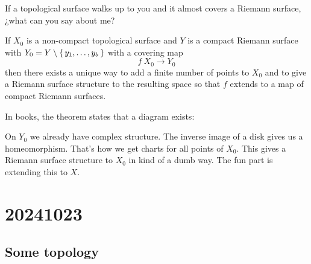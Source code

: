 \documentclass[12pt]{memoir}
\begin{document}
\begin{significant}
    If a topological surface walks up to you and it almost covers a Riemann surface, ¿what can you say about me?
\end{significant}

\begin{Th}[$R\exists T$]
    If $X_0$ is a non-compact topological surface and $Y$ is a compact Riemann surface with $Y_0=Y\setminus\{\,y_1,\dots,y_b\,\}$ with a covering map
    $$f\: X_0\to Y_0$$
    then there exists a unique way to add a finite number of points to $X_0$ and to give a Riemann surface structure to the resulting space so that $f$ extends to a map of compact Riemann surfaces.
\end{Th}

In books, the theorem states that a diagram exists:

\begin{center}
\end{center}

On $Y_0$ we already have complex structure. The inverse image of a disk gives us a homeomorphism. That's how we get charts for all points of $X_0$. This gives a Riemann surface structure to $X_0$ in kind of a dumb way. The fun part is extending this to $X$.

\section{20241023}

\subsection{Some topology}
\end{document}
